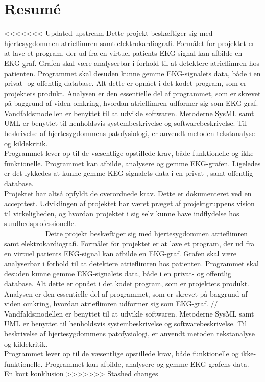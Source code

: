 \chapter{Resumé}

<<<<<<< Updated upstream
Dette projekt beskæftiger sig med hjertesygdommen atrieflimren samt elektrokardiografi. Formålet for projektet er at lave et program, der ud fra en virtuel patients EKG-signal kan afbilde en EKG-graf. Grafen skal være analyserbar i forhold til at detektere atrieflimren hos patienten. Programmet skal desuden kunne gemme EKG-signalets data, både i en privat- og offentlig database. Alt dette er opnået i det kodet program, som er projektets produkt. Analysen er den essentielle del af programmet, som er skrevet på baggrund af viden omkring, hvordan atrieflimren udformer sig som EKG-graf.\\
Vandfaldsmodellen er benyttet til at udvikle softwaren. Metoderne SysML samt UML er benyttet til henholdsvis systembeskrivelse og softwarebeskrivelse. Til beskrivelse af hjertesygdommens patofysiologi, er anvendt metoden tekstanalyse og kildekritik.\\
Programmet lever op til de væsentlige opstillede krav, både funktionelle og ikke-funktionelle. Programmet kan afbilde, analysere og gemme EKG-grafen. Ligeledes er det lykkedes at kunne gemme KEG-signalets data i en privat-, samt offentlig database.\\  
Projektet har altså opfyldt de overordnede krav. Dette er dokumenteret ved en accepttest. Udviklingen af projektet har været præget af projektgruppens vision til virkeligheden, og hvordan projektet i sig selv kunne have indflydelse hos sundhedsprofessionelle.\\
=======
Dette projekt beskæftiger sig med hjertesygdommen atrieflimren samt elektrokardiografi. Formålet for projektet er at lave et program, der ud fra en virtuel patients EKG-signal kan afbilde en EKG-graf. Grafen skal være  analyserbar i forhold til at detektere atrieflimren hos patienten. Programmet skal desuden kunne gemme EKG-signalets data, både i en privat- og offentlig database. Alt dette er opnået i det kodet program, som er projektets produkt. Analysen er den essentielle del af programmet, som er skrevet på baggrund af viden omkring, hvordan atrieflimren udformer sig som EKG-graf. //
Vandfaldsmodellen er benyttet til at udvikle softwaren. Metoderne SysML samt UML er benyttet til henholdsvis systembeskrivelse og softwarebeskrivelse. Til beskrivelse af hjertesygdommens patofysiologi, er anvendt metoden tekstanalyse og kildekritik.\\
Programmet lever op til de væsentlige opstillede krav, både funktionelle og ikke-funktionelle. Programmet kan afbilde, analysere og gemme EKG-grafens data.\\  

En kort konklusion 
>>>>>>> Stashed changes
